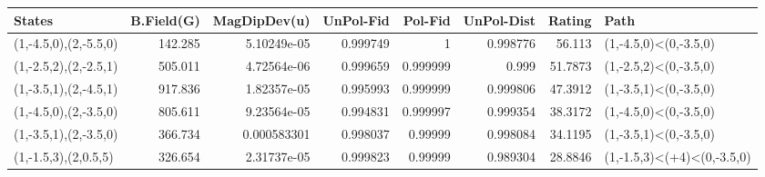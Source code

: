 \begin{tabular}{lrrrrrrl}
\hline
 States                &   B.Field(G) &   MagDipDev(u) &   UnPol-Fid &   Pol-Fid &   UnPol-Dist &   Rating & Path                       \\
\hline
 (1,-4.5,0),(2,-5.5,0) &      142.285 &    5.10249e-05 &    0.999749 &  1        &     0.998776 &  56.113  & (1,-4.5,0)<(0,-3.5,0)      \\
 (1,-2.5,2),(2,-2.5,1) &      505.011 &    4.72564e-06 &    0.999659 &  0.999999 &     0.999    &  51.7873 & (1,-2.5,2)<(0,-3.5,0)      \\
 (1,-3.5,1),(2,-4.5,1) &      917.836 &    1.82357e-05 &    0.995993 &  0.999999 &     0.999806 &  47.3912 & (1,-3.5,1)<(0,-3.5,0)      \\
 (1,-4.5,0),(2,-3.5,0) &      805.611 &    9.23564e-05 &    0.994831 &  0.999997 &     0.999354 &  38.3172 & (1,-4.5,0)<(0,-3.5,0)      \\
 (1,-3.5,1),(2,-3.5,0) &      366.734 &    0.000583301 &    0.998037 &  0.99999  &     0.998084 &  34.1195 & (1,-3.5,1)<(0,-3.5,0)      \\
 (1,-1.5,3),(2,0.5,5)  &      326.654 &    2.31737e-05 &    0.999823 &  0.99999  &     0.989304 &  28.8846 & (1,-1.5,3)<(+4)<(0,-3.5,0) \\
\hline
\end{tabular}